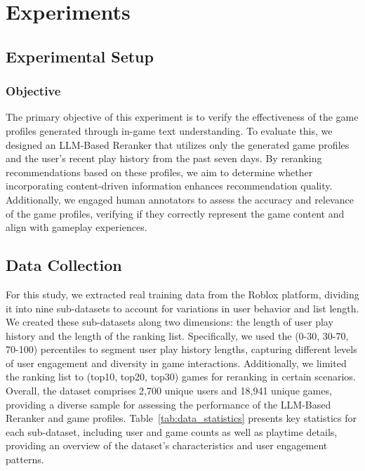 

\section{Experiments}

\subsection{Experimental Setup}

\subsubsection{Objective}
The primary objective of this experiment is to verify the effectiveness of the game profiles generated through in-game text understanding. To evaluate this, we designed an LLM-Based Reranker that utilizes only the generated game profiles and the user’s recent play history from the past seven days. By reranking recommendations based on these profiles, we aim to determine whether incorporating content-driven information enhances recommendation quality. Additionally, we engaged human annotators to assess the accuracy and relevance of the game profiles, verifying if they correctly represent the game content and align with gameplay experiences.

\subsection{Data Collection}
For this study, we extracted real training data from the Roblox platform, dividing it into nine sub-datasets to account for variations in user behavior and list length. We created these sub-datasets along two dimensions: the length of user play history and the length of the ranking list. Specifically, we used the (0-30, 30-70, 70-100) percentiles to segment user play history lengths, capturing different levels of user engagement and diversity in game interactions. Additionally, we limited the ranking list to (top10, top20, top30) games for reranking in certain scenarios. Overall, the dataset comprises 2,700 unique users and 18,941 unique games, providing a diverse sample for assessing the performance of the LLM-Based Reranker and game profiles. Table~\ref{tab:data_statistics} presents key statistics for each sub-dataset, including user and game counts as well as playtime details, providing an overview of the dataset’s characteristics and user engagement patterns.

